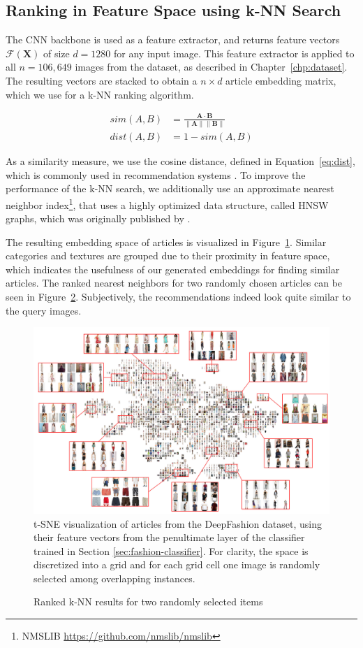 \subsection{Ranking in Feature Space using k-NN Search}
The \ac{CNN} backbone is used as a feature extractor, and returns feature vectors $\mathcal{F}(\boldsymbol{X})$ of size $d= 1280$ for any input image. This feature extractor is applied to all $n= 106,649$ images from the dataset, as described in Chapter~\ref{chp:dataset}. The resulting vectors are stacked to obtain a $n\times d$ article embedding matrix, which we use for a k-NN ranking algorithm.

\begin{align}
sim(A, B) &= \frac{\mathbf{A} \cdot \mathbf{B}}{\|\mathbf{A}\| \|\mathbf{B}\|}
\label{eq:sim}\\
dist(A, B) &= 1 - sim(A,B)
\label{eq:dist}
\end{align}
 
As a similarity measure, we use the cosine distance, defined in Equation~\ref{eq:dist}, which is commonly used in recommendation systems \parencite{desrosiers2011comprehensive}. To improve the performance of the \ac{k-NN} search, we additionally use an approximate nearest neighbor index\footnote{NMSLIB \url{https://github.com/nmslib/nmslib}}, that uses a highly optimized data structure, called \ac{HNSW} graphs, which was originally published by \cite{malkov2018efficient}.

The resulting embedding space of articles is visualized in Figure~\ref{fig:tsne}. Similar categories and textures are grouped due to their proximity in feature space, which indicates the usefulness of our generated embeddings for finding similar articles. The ranked nearest neighbors for two randomly chosen articles can be seen in Figure~\ref{fig:reco}. Subjectively, the recommendations indeed look quite similar to the query images.

\begin{figure}
	\centering
	\includegraphics[width=\textwidth]{images/tsne/normal-24-epochs-magnified-rescaled}
	\caption{\acs{t-SNE} visualization of articles from the DeepFashion dataset, using their feature vectors from the penultimate layer of the classifier trained in Section \ref{sec:fashion-classifier}. For clarity, the space is discretized into a grid and for each grid cell one image is randomly selected among overlapping instances.}
	\label{fig:tsne}
\end{figure}

\begin{figure}[H]
	\centering
	
	\caption{Ranked k-NN results for two randomly selected items}
	\label{fig:reco}
\end{figure}
